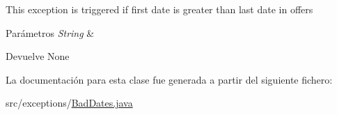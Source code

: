This exception is triggered if first date is greater than last date in offers 
\begin{DoxyParams}{Parámetros}
{\em String} & \\
\hline
\end{DoxyParams}
\begin{DoxyReturn}{Devuelve}
None 
\end{DoxyReturn}


La documentación para esta clase fue generada a partir del siguiente fichero\+:\begin{DoxyCompactItemize}
\item 
src/exceptions/\mbox{\hyperlink{_bad_dates_8java}{Bad\+Dates.\+java}}\end{DoxyCompactItemize}
